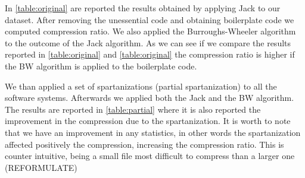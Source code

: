In \cref{table:original} are reported the results obtained by applying Jack to
our dataset. After removing the unessential code and obtaining boilerplate
code we computed compression ratio. We also applied the Burroughs-Wheeler
algorithm to the outcome of the Jack algorithm. As we can see if we compare
the results reported in \cref{table:original} and \cref{table:original} the
compression ratio is higher if the BW algorithm is applied to the boilerplate
code.

\begin{table}
  \label{table:original}
  \caption{The results of the compression using the Jack algorithm alone and both Jack and
  Burroughs-Wheeler algorithms combined}
  \centering
\end{table}

We than applied a set of spartanizations (partial spartanization) to all the
software systems. Afterwards we applied both the Jack and the BW algorithm.
The results are reported in \cref{table:partial} where it is also
reported the improvement in the compression due to the spartanization. It is
worth to note that we have an improvement in any statistics, in other words the
spartanization affected positively the compression, increasing the compression
ratio. This is counter intuitive, being a small file most difficult to
compress than a larger one (REFORMULATE)

